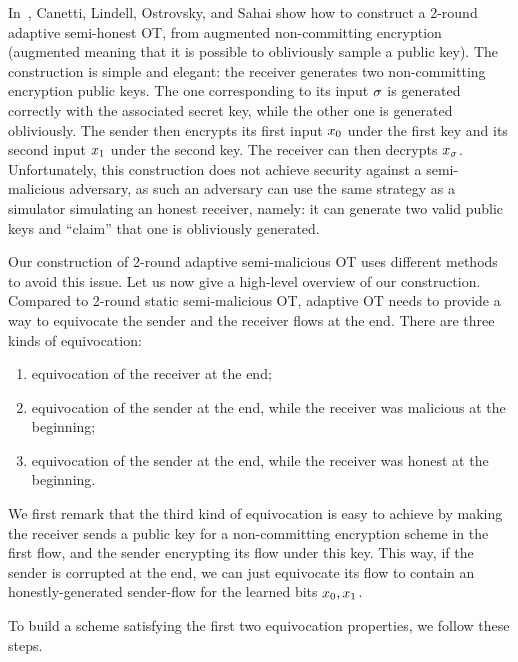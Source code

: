 In~\cite{STOC:CLOS02}, Canetti, Lindell, Ostrovsky, and Sahai show how to construct a 2-round adaptive semi-honest OT, from augmented non-committing encryption (augmented meaning that it is possible to obliviously sample a public key).
The construction is simple and elegant: the receiver generates two non-committing encryption public keys. The one corresponding to its input $\sigma$ is generated correctly with the associated secret key, while the other one is generated obliviously.
The sender then encrypts its first input $x_0$ under the first key and its second input $x_1$ under the second key.
The receiver can then decrypts $x_\sigma$.
Unfortunately, this construction does not achieve security against a semi-malicious adversary, as such an adversary can use the same strategy as a simulator simulating an honest receiver, namely: it can generate two valid public keys and ``claim'' that one is obliviously generated.


Our construction of 2-round adaptive semi-malicious OT uses different methods to avoid this issue.
Let us now give a high-level overview of our construction.
%
Compared to 2-round static semi-malicious OT, adaptive OT needs to provide a way to equivocate the sender and the receiver flows at the end. There are three kinds of equivocation:
\begin{enumerate}
\item equivocation of the receiver at the end;
\item equivocation of the sender at the end, while the receiver was malicious at the beginning;
\item equivocation of the sender at the end, while the receiver was honest at the beginning.
\end{enumerate}

We first remark that the third kind of equivocation is easy to achieve by making the receiver sends a public key for a non-committing encryption scheme in the first flow, and the sender encrypting its flow under this key.
This way, if the sender is corrupted at the end, we can just equivocate its flow to contain an honestly-generated sender-flow for the learned bits $x_0,x_1$.

To build a scheme satisfying the first two equivocation properties, we follow these steps.

